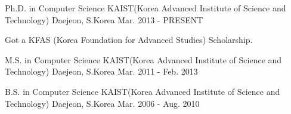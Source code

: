 

\begin{cventries}

  \cventry
    {Ph.D. in Computer Science} %
    {KAIST(Korea Advanced Institute of Science and Technology)} %
    {Daejeon, S.Korea} %
    {Mar. 2013 - PRESENT} %
    {
      \begin{cvitems} %
      \item {Got a KFAS (Korea Foundation for Advanced Studies) Scholarship.}
      \end{cvitems}
    }

  \cventry
    {M.S. in Computer Science} %
    {KAIST(Korea Advanced Institute of Science and Technology)} %
    {Daejeon, S.Korea} %
    {Mar. 2011 - Feb. 2013} %
    {
    }

  \cventry
    {B.S. in Computer Science} %
    {KAIST(Korea Advanced Institute of Science and Technology)} %
    {Daejeon, S.Korea} %
    {Mar. 2006 - Aug. 2010} %
    {
    }

\end{cventries}
